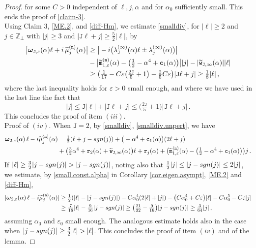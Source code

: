 \documentclass[10pt,a4paper]{amsart}
\newcommand{\Z}{{\mathbb Z}}
\newcommand{\bomega}{{\boldsymbol{\omega}}}
\newcommand{\im}{{\rm i}}
\newcommand{\tJ}{{\mathtt J}}
\newcommand{\tc}{{\mathtt c}}
\newcommand{\tm}{{\mathtt m}}
\newcommand{\tn}{{\mathtt n}}
\newcommand{\tr}{{\mathtt r}}
\newcommand{\tw}{{\mathtt w}}
\newcommand{\wt}[1]{{\widetilde{#1}}}
\begin{document}
\begin{proof}
   		for some  $C>0$ independent of $\ell,j,\alpha$ and for $\alpha_{0}$ sufficiently small. This ends the proof of \eqref{claim-3}.
        \\[1mm]
   	Using Claim 3, \eqref{ME.2}, and \eqref{diff-Hm}, we estimate \eqref{smalldiv}, for $|\ell|\geq 2$ and $j\in\Z_{\perp}$ with $|j|\geq 3$ and $|\tJ \ell + j|\geq \tfrac52 |\ell|$, by
   	\begin{align}
   		\big| \bomega_{\tJ,\varepsilon}(\alpha)  \ell + \im\,\wt\mu_{j}^{(\tn)}(\alpha) \big| &  \geq \big| -\im \big( \lambda_{\tJ}^{(\infty)}(\alpha)  \ell \pm \lambda_{j}^{(\infty)}(\alpha) \big) \big| \\
        &-  \big| \wt\tm_{1,\varepsilon}^{(\tn)}(\alpha) - \big( \tfrac12 -\alpha^4 + \tc_{1}(\alpha) \big)  \big| |j| - |\wt\tw_{\tJ,\infty}(\alpha)| |\ell|  \\
   		& \geq \big( \tfrac{1}{17} - C\varepsilon\big(\tfrac{2\tJ}{5}+1\big)  - \tfrac25 C\varepsilon  \big)|\tJ\ell+j| \geq \tfrac{1}{8}|\ell|  \,,
   	\end{align}
   	where the last inequality holds for $\varepsilon>0$ small enough, and where we have used in the last line the fact that
    $$
    |j|\leqslant \tJ|\ell|+|\tJ\ell+j|\leqslant \big(\tfrac{2\tJ}{5}+1\big)|\tJ\ell+j|\,.
    $$
    This concludes the proof of item $(iii)$.
    	\\[1mm]
   	{\sc Proof of $(iv)$}. When $\tJ=2$, by \eqref{smalldiv}, \eqref{smalldiv.unpert}, we have
    \begin{align}
        \bomega_{2,\varepsilon}(\alpha)\,\ell - \im \wt\mu_{j}^{(\tn)}(\alpha) & = \tfrac12 (\ell + j- {\rm sgn}(j)) + \big( -\alpha^4 + \tc_1(\alpha) \big) (2\ell + j) \\
        & + \big( \tfrac32 \alpha^4 + \tr_{2}(\alpha) +\wt\tw_{\tJ,\infty}(\alpha) \big)\ell   + \tr_{j}(\alpha) + \big( \wt\tm_{1,\varepsilon}^{(\tn)}(\alpha) - \big( \tfrac12 -\alpha^4 + \tc_{1}(\alpha) \big)  \big)j \,. 
    \end{align}
    If $|\ell|\geq \frac32 |j-{\rm sgn}(j)|> |j-{\rm sgn}(j)|$, noting also that $\tfrac12 |j| \leq |j-{\rm sgn}(j)|\leq 2|j|$,
    we estimate, by \eqref{small.const.alpha} in Corollary \ref{cor.eigen.asympt}, \eqref{ME.2} and \eqref{diff-Hm},
    \begin{align}
        |   \bomega_{2,\varepsilon}(\alpha)\,\ell - \im \wt\mu_{j}^{(\tn)}(\alpha) | & \geq \tfrac12 ( |\ell| - |j-{\rm sgn}(j)| ) - C \alpha_{0}^4 ( 2|\ell| +|j| ) - \big( C\alpha_0^4 + C\varepsilon \big)|\ell| - C \alpha_0^5 - C\varepsilon |j| \\
        & \geq \tfrac{7}{16} |\ell| - \tfrac{9}{16} |j-{\rm sgn}(j)| \geq \big( \tfrac{21}{32} - \tfrac{9}{16} \big) |j-{\rm sgn}(j)| \geq  \tfrac{3}{64} |j|\,,
    \end{align}
    assuming $\alpha_0$ and $\varepsilon_0$ small enough. The analogous estimate holds also in the case when $|j-{\rm sgn}(j)|\geq  \tfrac32 |\ell|>|\ell|$. This concludes the proof of item $(iv)$ and of the lemma.
\end{proof}
\end{document}
